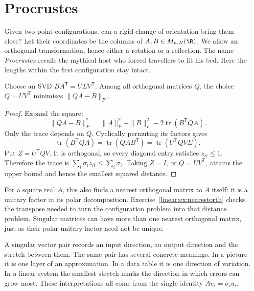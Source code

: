 \section{Procrustes}

Given two point configurations, can a rigid change of orientation bring them close? Let their coordinates be the columns of $A,B\in M_{n,N}(\R)$. We allow an orthogonal transformation, hence either a rotation or a reflection. The name \emph{Procrustes} recalls the mythical host who forced travellers to fit his bed. Here the lengths within the first configuration stay intact.

\begin{theorem}\label{linear:thm:procrustes}
Choose an SVD $BA^{\mathsf T}=U\Sigma V^{\mathsf T}$. Among all orthogonal matrices $Q$, the choice $Q=UV^{\mathsf T}$ minimises $\|QA-B\|_F$.
\end{theorem}
\begin{proof}
Expand the square:
\[
\|QA-B\|_F^2=\|A\|_F^2+\|B\|_F^2-2\operatorname{tr}(B^{\mathsf T}QA).
\]
Only the trace depends on $Q$. Cyclically permuting its factors gives
\[
\operatorname{tr}(B^{\mathsf T}QA)=\operatorname{tr}(QAB^{\mathsf T})
=\operatorname{tr}(U^{\mathsf T}QV\Sigma).
\]
Put $Z=U^{\mathsf T}QV$. It is orthogonal, so every diagonal entry satisfies $z_{ii}\le1$. Therefore the trace is $\sum_i\sigma_iz_{ii}\le\sum_i\sigma_i$. Taking $Z=I$, or $Q=UV^{\mathsf T}$, attains the upper bound and hence the smallest squared distance.
\end{proof}

For a square real $A$, this also finds a nearest orthogonal matrix to $A$ itself: it is a unitary factor in its polar decomposition. Exercise~\ref{linear:ex:nearestorth} checks the transpose needed to turn the configuration problem into that distance problem. Singular matrices can have more than one nearest orthogonal matrix, just as their polar unitary factor need not be unique.

\begin{beauty}
A singular vector pair records an input direction, an output direction and the stretch between them. The same pair has several concrete meanings. In a picture it is one layer of an approximation. In a data table it is one direction of variation. In a linear system the smallest stretch marks the direction in which errors can grow most. These interpretations all come from the single identity $Av_i=\sigma_iu_i$.
\end{beauty}

